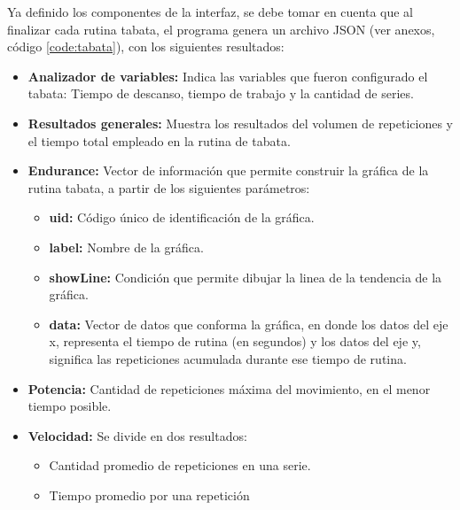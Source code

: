 Ya definido los componentes de la interfaz, se debe tomar en cuenta que al finalizar cada rutina tabata, el programa genera un archivo JSON (ver anexos, c\'odigo  \ref{code:tabata}), con los siguientes resultados:
\begin{itemize}
	\item \textbf{Analizador de variables:} Indica las variables que fueron configurado el tabata: Tiempo de descanso, tiempo de trabajo y la cantidad de series.
	\item  \textbf{Resultados generales:} Muestra los resultados del volumen de repeticiones  y el tiempo total empleado en la rutina de tabata.
	\item  \textbf{Endurance:} Vector de informaci\'on que permite construir la gr\'afica de la rutina tabata, a partir de los siguientes par\'ametros:
	   \begin{itemize}  
   	\item \textbf{uid:} C\'odigo \'unico de identificaci\'on de la gr\'afica.
   	\item \textbf{label:} Nombre de la gr\'afica.
   	\item \textbf{showLine:} Condici\'on que permite dibujar la linea de la tendencia de la gr\'afica.
    \item \textbf{data:} Vector de datos que conforma la gr\'afica, en donde los datos del eje x, representa el tiempo de rutina (en segundos) y los datos del eje y, significa las repeticiones acumulada durante ese tiempo de rutina.
   \end{itemize}     
    \item \textbf{Potencia:} Cantidad de repeticiones m\'axima del movimiento, en el menor tiempo posible.
    \item \textbf{Velocidad:} Se divide en dos resultados:
           \begin{itemize}
       \item Cantidad promedio de repeticiones en una serie.
       \item Tiempo promedio por una repetici\'on
       \end{itemize}
\end{itemize} 

